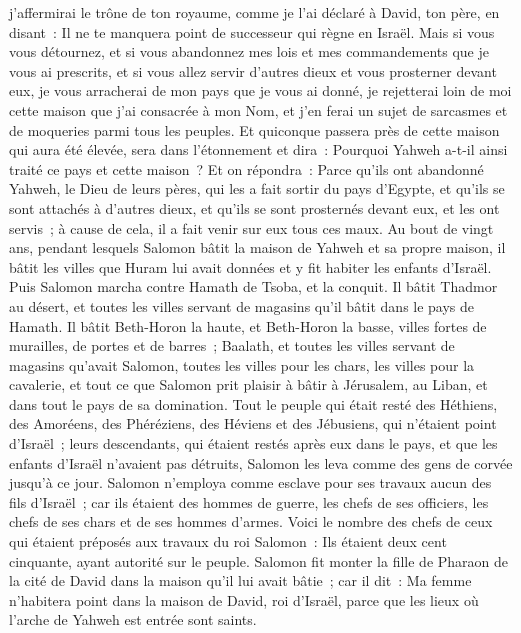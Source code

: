 \begin{multicols}{2}
j'affermirai le trône de ton royaume, comme je l'ai déclaré à David, ton père, en disant~: Il ne te manquera point de successeur qui règne en Israël.
Mais si vous vous détournez, et si vous abandonnez mes lois et mes commandements que je vous ai prescrits, et si vous allez servir d'autres dieux et vous prosterner devant eux,
je vous arracherai de mon pays que je vous ai donné, je rejetterai loin de moi cette maison que j'ai consacrée à mon Nom, et j'en ferai un sujet de sarcasmes et de moqueries parmi tous les peuples.
Et quiconque passera près de cette maison qui aura été élevée, sera dans l'étonnement et dira~: Pourquoi Yahweh a-t-il ainsi traité ce pays et cette maison~?
Et on répondra~: Parce qu'ils ont abandonné Yahweh, le Dieu de leurs pères, qui les a fait sortir du pays d'Egypte, et qu'ils se sont attachés à d'autres dieux, et qu'ils se sont prosternés devant eux, et les ont servis~; à cause de cela, il a fait venir sur eux tous ces maux.
\VerseOne{}Au bout de vingt ans, pendant lesquels Salomon bâtit la maison de Yahweh et sa propre maison,
il bâtit les villes que Huram lui avait données et y fit habiter les enfants d'Israël.
Puis Salomon marcha contre Hamath de Tsoba, et la conquit.
Il bâtit Thadmor au désert, et toutes les villes servant de magasins qu'il bâtit dans le pays de Hamath.
Il bâtit Beth-Horon la haute, et Beth-Horon la basse, villes fortes de murailles, de portes et de barres~;
Baalath, et toutes les villes servant de magasins qu'avait Salomon, toutes les villes pour les chars, les villes pour la cavalerie, et tout ce que Salomon prit plaisir à bâtir à Jérusalem, au Liban, et dans tout le pays de sa domination.
Tout le peuple qui était resté des Héthiens, des Amoréens, des Phéréziens, des Héviens et des Jébusiens, qui n'étaient point d'Israël~;
leurs descendants, qui étaient restés après eux dans le pays, et que les enfants d'Israël n'avaient pas détruits, Salomon les leva comme des gens de corvée jusqu'à ce jour.
Salomon n'employa comme esclave pour ses travaux aucun des fils d'Israël~; car ils étaient des hommes de guerre, les chefs de ses officiers, les chefs de ses chars et de ses hommes d'armes.
Voici le nombre des chefs de ceux qui étaient préposés aux travaux du roi Salomon~: Ils étaient deux cent cinquante, ayant autorité sur le peuple.
Salomon fit monter la fille de Pharaon de la cité de David dans la maison qu'il lui avait bâtie~; car il dit~: Ma femme n'habitera point dans la maison de David, roi d'Israël, parce que les lieux où l'arche de Yahweh est entrée sont saints.

\end{multicols}
